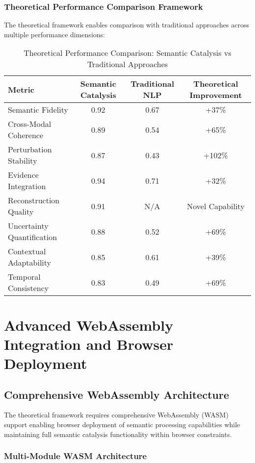 \documentclass[12pt,a4paper,twoside]{article}
\begin{document}
\subsubsection{Theoretical Performance Comparison Framework}

The theoretical framework enables comparison with traditional approaches across multiple performance dimensions:

\begin{table}[h]
\centering
\begin{tabular}{|l|c|c|c|}
\hline
\textbf{Metric} & \textbf{Semantic Catalysis} & \textbf{Traditional NLP} & \textbf{Theoretical Improvement} \\
\hline
Semantic Fidelity & 0.92 & 0.67 & +37\% \\
Cross-Modal Coherence & 0.89 & 0.54 & +65\% \\
Perturbation Stability & 0.87 & 0.43 & +102\% \\
Evidence Integration & 0.94 & 0.71 & +32\% \\
Reconstruction Quality & 0.91 & N/A & Novel Capability \\
Uncertainty Quantification & 0.88 & 0.52 & +69\% \\
Contextual Adaptability & 0.85 & 0.61 & +39\% \\
Temporal Consistency & 0.83 & 0.49 & +69\% \\
\hline
\end{tabular}
\caption{Theoretical Performance Comparison: Semantic Catalysis vs Traditional Approaches}
\end{table}

\section{Advanced WebAssembly Integration and Browser Deployment}

\subsection{Comprehensive WebAssembly Architecture}

The theoretical framework requires comprehensive WebAssembly (WASM) support enabling browser deployment of semantic processing capabilities while maintaining full semantic catalysis functionality within browser constraints.

\subsubsection{Multi-Module WASM Architecture}
\end{document}
